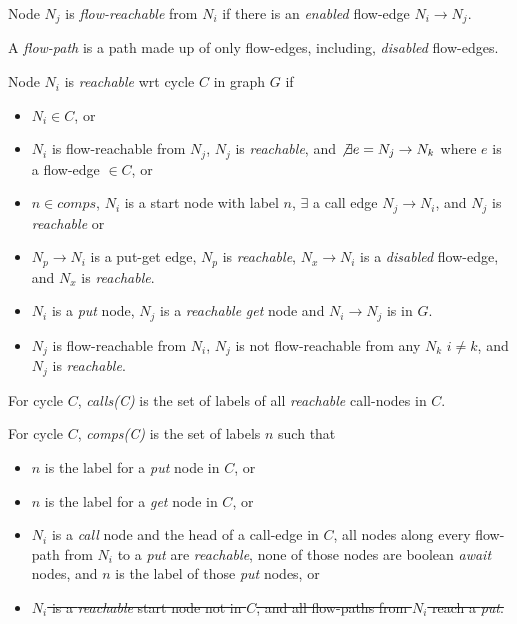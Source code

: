 \documentclass[12pt]{article}%
\begin{document}
\begin{definition}
Node $N_j$ is \emph{flow-reachable} from $N_i$ if there is an \emph{enabled} flow-edge $N_i \rightarrow N_j$. 
\end{definition}

\begin{definition}
A \emph{flow-path} is a path made up of only flow-edges, including, \emph{disabled} flow-edges.
\end{definition}

\begin{definition}
\label{defn-reachable}
Node $N_i$ is \emph{reachable} wrt cycle $C$ in graph $G$ if
\begin{itemize}
\item $N_i \in C$, or
\item $N_i$ is flow-reachable from $N_j$, $N_j$ is \emph{reachable}, and $\not\exists e = N_j \rightarrow N_k$ where $e$ is a flow-edge $\in C$, or
\item $n \in {comps}$, $N_i$ is a start node with label $n$, $\exists$ a call edge $N_j \rightarrow N_i$, and $N_j$ is \emph{reachable} or
\item $N_p \rightarrow N_i$ is a put-get edge, $N_p$ is \emph{reachable}, $N_x \rightarrow N_i$ is a \emph{disabled} flow-edge, and
$N_x$ is \emph{reachable}.

\item $N_i$ is a \emph{put} node, $N_j$ is a \emph{reachable} \emph{get} node and $N_i \rightarrow N_j$ is in $G$. %
\item $N_j$ is flow-reachable from $N_i$, $N_j$ is not flow-reachable from any  $N_k$ $i \not = k$, and $N_j$ is \emph{reachable}.


\end{itemize}
\end{definition}

\begin{definition}
\label{defn-calls}
For cycle $C$, \emph{calls(C)} is the set of labels of all \emph{reachable} call-nodes in $C$.
\end{definition}

\begin{definition}
\label{defn-comps}
For cycle $C$, \emph{comps(C)} is the set of labels ${n}$ such that 
\begin{itemize}
\item ${n}$ is the label for a \emph{put} node in $C$, or
\item ${n}$ is the label for a \emph{get} node in $C$, or 
\item $N_i$ is a \emph{call} node and the head of a call-edge in $C$, all nodes along every flow-path from $N_i$ to a \emph{put} are \emph{reachable},
none of those nodes are boolean \emph{await} nodes, and $n$ is the label of those \emph{put} nodes, or
\item \sout{$N_i$ is a \emph{reachable} start node not in $C$, and all flow-paths from $N_i$ reach a \emph{put}.}
\end{itemize}

\end{definition}
\end{document}
